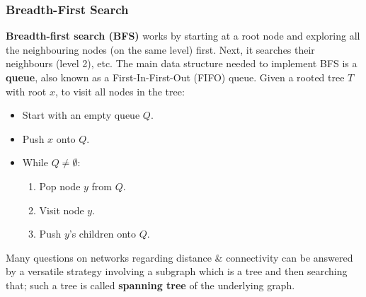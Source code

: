\documentclass[a4paper,11pt]{article}
\begin{document}
\subsubsection{Breadth-First Search}
\textbf{Breadth-first search (BFS)} works by starting at a root node and exploring all the neighbouring nodes (on the same level) first.
Next, it searches their neighbours (level 2), etc.
The main data structure needed to implement BFS is a \textbf{queue}, also known as a First-In-First-Out (FIFO) queue. 
Given a rooted tree $T$ with root $x$, to visit all nodes in the tree:
\begin{itemize}
    \item   Start with an empty queue $Q$.
    \item   Push $x$ onto $Q$.
    \item   While $Q \neq \emptyset$:
            \begin{enumerate}[label=\arabic*.]
                \item   Pop node $y$ from $Q$.
                \item   Visit node $y$.
                \item   Push $y$'s children onto $Q$.
            \end{enumerate}
\end{itemize}

Many questions on networks regarding distance \& connectivity can be answered by a versatile strategy involving a subgraph which is a tree and then searching that; such a tree is called \textbf{spanning tree} of the underlying graph.
\end{document}
